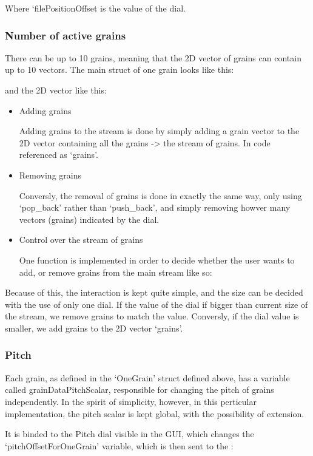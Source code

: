 Where `filePositionOffset is the value of the dial.
\subsubsection{Number of active grains}
There can be up to 10 grains, meaning that the 2D vector of
grains can contain up to 10 vectors. The main struct of one grain
looks like this:

and the 2D vector like this:

\begin{itemize}
\item Adding grains

Adding grains to the stream is done by simply adding a grain vector to
the 2D vector containing all the grains -> the stream of grains. In
code referenced as `grains'.

\item Removing grains

Conversly, the removal of grains is done in exactly the same way, only
using `pop\_back' rather than `push\_back', and simply removing howver
many vectors (grains) indicated by the dial. 

\item Control over the stream of grains

One function is implemented in order to decide whether the user wants
to add, or remove grains from the main stream like so:
\end{itemize}

Because of this, the interaction is kept quite simple, and the size
can be decided with the use of only one dial. If the value of the dial
if bigger than current size of the stream, we remove grains to match
the value. Conversly, if the dial value is smaller, we add grains to
the 2D vector `grains'.

\subsubsection{Pitch}
Each grain, as defined in the `OneGrain' struct defined above, has a
variable called grainDataPitchScalar, responsible for changing the
pitch of grains independently. In the spirit of simplicity, however,
in this perticular implementation, the pitch scalar is kept global,
with the possibility of extension.

It is binded to the Pitch dial visible in the GUI, which changes the
`pitchOffsetForOneGrain' variable, which is then sent to the :

